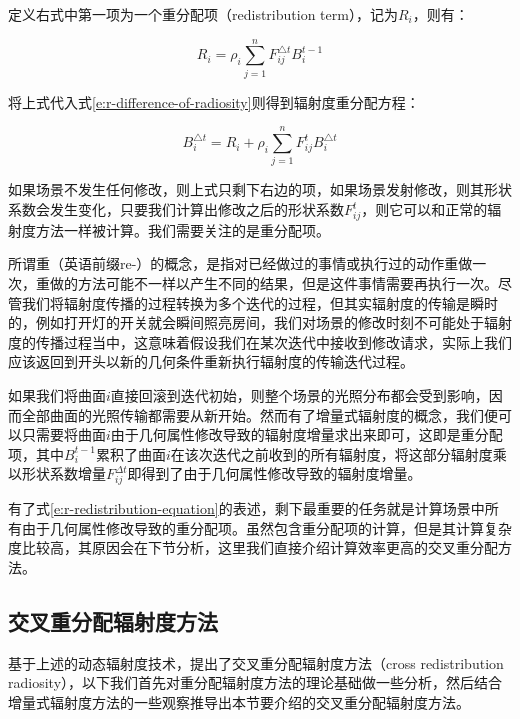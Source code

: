 \noindent 定义右式中第一项为一个重分配项（redistribution term），记为$R_i$，则有：

\begin{equation}\label{e:r-redistribution-term}
	R_i=\rho_i\sum^{n}_{j=1}F^{\triangle t}_{ij}B^{t-1}_i
\end{equation}

\noindent 将上式代入式\ref{e:r-difference-of-radiosity}则得到辐射度重分配方程：

\begin{equation}\label{e:r-redistribution-equation}
	B^{\triangle t}_i=R_i+\rho_i\sum^{n}_{j=1}F^{t}_{ij}B^{\triangle t}_i
\end{equation}

如果场景不发生任何修改，则上式只剩下右边的项，如果场景发射修改，则其形状系数会发生变化，只要我们计算出修改之后的形状系数$F^{t}_{ij}$，则它可以和正常的辐射度方法一样被计算。我们需要关注的是重分配项。

所谓重（英语前缀re-）的概念，是指对已经做过的事情或执行过的动作重做一次，重做的方法可能不一样以产生不同的结果，但是这件事情需要再执行一次。尽管我们将辐射度传播的过程转换为多个迭代的过程，但其实辐射度的传输是瞬时的，例如打开灯的开关就会瞬间照亮房间，我们对场景的修改时刻不可能处于辐射度的传播过程当中，这意味着假设我们在某次迭代中接收到修改请求，实际上我们应该返回到开头以新的几何条件重新执行辐射度的传输迭代过程。

如果我们将曲面$i$直接回滚到迭代初始，则整个场景的光照分布都会受到影响，因而全部曲面的光照传输都需要从新开始。然而有了增量式辐射度的概念，我们便可以只需要将曲面$i$由于几何属性修改导致的辐射度增量求出来即可，这即是重分配项，其中$B^{t-1}_i$累积了曲面$i$在该次迭代之前收到的所有辐射度，将这部分辐射度乘以形状系数增量$F^{\Delta t}_{ij}$即得到了由于几何属性修改导致的辐射度增量。

有了式\ref{e:r-redistribution-equation}的表述，剩下最重要的任务就是计算场景中所有由于几何属性修改导致的重分配项。虽然\cite{a:RadiosityRedistributionforDynamicEnvironments}包含重分配项的计算，但是其计算复杂度比较高，其原因会在下节分析，这里我们直接介绍计算效率更高的交叉重分配方法。




\subsection{交叉重分配辐射度方法}\label{sec:r-cross-edistribution-adiosity}
基于上述的动态辐射度技术，\cite{a:Real-TimeDynamicRadiosityforHighQualityGlobalIllumination}提出了交叉重分配辐射度方法（cross redistribution radiosity），以下我们首先对重分配辐射度方法的理论基础做一些分析，然后结合增量式辐射度方法的一些观察推导出本节要介绍的交叉重分配辐射度方法。



